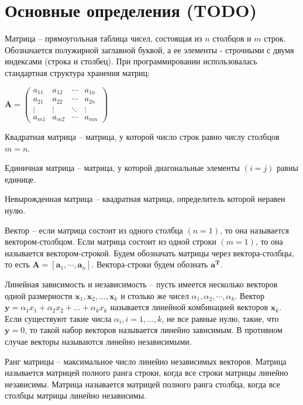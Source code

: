 \newpage

\section{Основные определения (TODO)}

Матрица – прямоугольная таблица чисел, состоящая из $ n $ столбцов и $ m $ строк. Обозначается полужирной заглавной буквой, а ее элементы - строчными с двумя индексами (строка и столбец). При программировании использовалась стандартная структура хранения матриц:

$ \mathbf{A} = \left( 
\begin{array}{cccc}
a_{11} & a_{12} & \cdots & a_{1n} \\
a_{21} & a_{22} & \cdots & a_{2n} \\
\vdots & \vdots & \ddots & \vdots \\
a_{m1} & a_{m2} & \cdots & a_{mn}
\end{array} \right) $

Квадратная матрица – матрица, у которой число строк равно числу столбцов $ m = n $.

Единичная матрица – матрица, у которой диагональные элементы $ (i = j) $ равны единице.

Невырожденная матрица – квадратная матрица, определитель которой неравен нулю.

Вектор – если матрица состоит из одного столбца $ (n = 1) $, то она называется вектором-столбцом. Если матрица состоит из одной строки $ (m = 1) $, то она называется вектором-строкой. Будем обозначать матрицы через вектора-столбцы, то есть $ \mathbf{A} = \left[ \mathbf{a}_1, \cdots, \mathbf{a}_n \right] $. Вектора-строки будем обознать $ \mathbf{a}^\mathbf{T} $.

Линейная зависимость и независимость – пусть имеется несколько векторов одной размерности $ \mathbf{x}_1, \mathbf{x}_2, \ldots ,\mathbf{x}_k $ и столько же чисел $ \alpha_1, \alpha_2, \cdots, \alpha_k $. Вектор $ \mathbf{y}=\alpha_1 x_1 + \alpha_2 x_2 + \ldots + \alpha_k x_k $ называется линейной комбинацией векторов $ \mathbf{x}_k $. Если существуют такие числа $ \alpha_i, i=1, \ldots, k $, не все равные нулю, такие, что $ \mathbf{y}=0 $, то такой набор векторов называется линейно зависимым. В противном случае векторы называются линейно независимыми.

Ранг матрицы – максимальное число линейно независимых векторов. Матрица называется матрицей полного ранга строки, когда все строки матрицы линейно независимы. Матрица называется матрицей полного ранга столбца, когда все столбцы матрицы линейно независимы.

